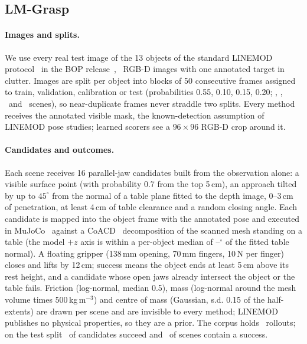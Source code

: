 \subsection{LM-Grasp}
\paragraph{Images and splits.} We use every real test image of the 13 objects of the standard LINEMOD protocol~\cite{hinterstoisser2012} in the BOP release~\cite{hodan2018bop}, \NScenes\ RGB-D images with one annotated target in clutter. Images are split per object into blocks of 50 consecutive frames assigned to train, validation, calibration or test (probabilities 0.55, 0.10, 0.15, 0.20; \NTrain, \NVal, \NCalib\ and \NTest\ scenes), so near-duplicate frames never straddle two splits. Every method receives the annotated visible mask, the known-detection assumption of LINEMOD pose studies; learned scorers see a $96\times96$ RGB-D crop around it.

\paragraph{Candidates and outcomes.} Each scene receives 16 parallel-jaw candidates built from the observation alone: a visible surface point (with probability 0.7 from the top 5\,cm), an approach tilted by up to $45^\circ$ from the normal of a table plane fitted to the depth image, 0--3\,cm of penetration, at least 4\,cm of table clearance and a random closing angle. Each candidate is mapped into the object frame with the annotated pose and executed in MuJoCo~\cite{todorov2012mujoco} against a CoACD~\cite{wei2022coacd} decomposition of the scanned mesh standing on a table (the model $+z$ axis is within a per-object median of \UprightDegLo--\UprightDegHi$^\circ$ of the fitted table normal). A floating gripper (138\,mm opening, 70\,mm fingers, 10\,N per finger) closes and lifts by 12\,cm; success means the object ends at least 5\,cm above its rest height, and a candidate whose open jaws already intersect the object or the table fails. Friction (log-normal, median 0.5), mass (log-normal around the mesh volume times 500\,kg\,m$^{-3}$) and centre of mass (Gaussian, s.d. 0.15 of the half-extents) are drawn per scene and are invisible to every method; LINEMOD publishes no physical properties, so they are a prior. The corpus holds \NRollouts\ rollouts; on the test split \TestBase\ of candidates succeed and \TestOracle\ of scenes contain a success.

